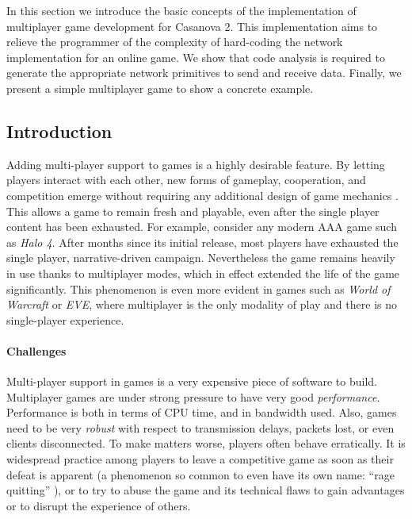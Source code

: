 In this section we introduce the basic concepts of the implementation of multiplayer game development for Casanova 2. This implementation aims to relieve the programmer of the complexity of hard-coding the network implementation for an online game. We show that code analysis is required to generate the appropriate network primitives to send and receive data. Finally, we present a simple multiplayer game to show a concrete example.

\subsection{Introduction}
Adding multi-player support to games is a highly desirable feature. By letting players interact with each other, new forms of gameplay, cooperation, and competition emerge without requiring any additional design of game mechanics \cite{granberg2014david}. This allows a game to remain fresh and playable, even after the single player content has been exhausted. For example, consider any modern AAA game such as \textit{Halo 4}. After months since its initial release, most players have exhausted the single player, narrative-driven campaign. Nevertheless the game remains heavily in use thanks to multiplayer modes, which in effect extended the life of the game significantly. This phenomenon is even more evident in games such as \textit{World of Warcraft} or \textit{EVE}, where multiplayer is the only modality of play and there is no single-player experience.

\paragraph{Challenges}
Multi-player support in games is a very expensive piece of software to build. Multiplayer games are under strong pressure to have very good \textit{performance}\cite{claypool2006latency}. Performance is both in terms of CPU time, and in bandwidth used. Also, games need to be very \textit{robust} with respect to transmission delays, packets lost, or even clients disconnected. To make matters worse, players often behave erratically. It is widespread practice among players to leave a competitive game as soon as their defeat is apparent (a phenomenon so common to even have its own name: ``rage quitting'' \cite{rage_quitting}), or to try to abuse the game and its technical flaws to gain advantages or to disrupt the experience of others.

